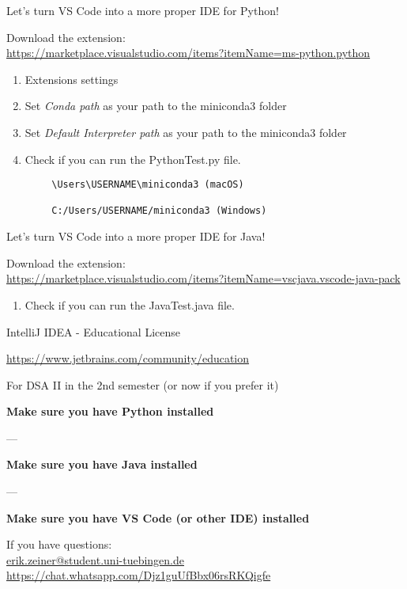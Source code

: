 \documentclass[aspectratio=169,hyperref={unicode}]{beamer}
\begin{document}
\begin{frame}[fragile]{Let's turn VS Code into a more proper IDE for Python!}
\begin{center}
	Download the extension: \\ \url{https://marketplace.visualstudio.com/items?itemName=ms-python.python}
\end{center}
	\begin{enumerate}
			\item Extensions settings
			\item Set \textit{Conda path} as your path to the miniconda3 folder
			\item Set \textit{Default Interpreter path} as your path to the miniconda3 folder
			\item Check if you can run the PythonTest.py file.
			\end{enumerate}
	\begin{verbatim}
		\Users\USERNAME\miniconda3 (macOS)
		
		C:/Users/USERNAME/miniconda3 (Windows)
	\end{verbatim}
\end{frame}


\begin{frame}{Let's turn VS Code into a more proper IDE for Java!}
		\begin{center}
		Download the extension: \\ \url{https://marketplace.visualstudio.com/items?itemName=vscjava.vscode-java-pack}	
		\end{center}
		\vfill
		\begin{enumerate}
			\item Check if you can run the JavaTest.java file.
			\end{enumerate}
\end{frame}

\begin{frame}{IntelliJ IDEA - Educational License}
\begin{center}
	\url{https://www.jetbrains.com/community/education}
\end{center}

\begin{center}
		For DSA II in the 2nd semester (or now if you prefer it)
\end{center}
\end{frame}
\begin{frame}
\begin{center}
\textbf{Make sure you have Python installed}

---

\textbf{Make sure you have Java installed}

---

\textbf{Make sure you have VS Code (or other IDE) installed}

\vfill
		If you have questions: \\ \href{mailto:erik.zeiner@student.uni-tuebingen.de}{erik.zeiner@student.uni-tuebingen.de}
		\\
		\url{https://chat.whatsapp.com/Djz1guUfBbx06rsRKQigfe}
\end{center}
\end{frame}
\end{document}
